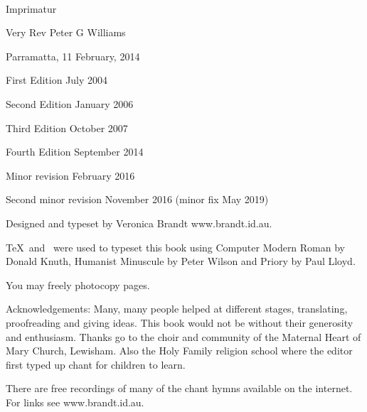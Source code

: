 \ 

\vfill

{\raggedright
{}

\parindent=0mm
\parskip=6pt

Imprimatur
\centerline{Very Rev Peter G Williams}
\rmlyrics

Parramatta, 11 February, 2014

\vfill

First Edition July 2004

Second Edition January 2006

Third Edition October 2007


Fourth Edition September 2014

\qquad Minor revision February 2016

\qquad Second minor revision November 2016 (minor fix May 2019)

Designed and typeset by Veronica Brandt www.brandt.id.au.

\TeX\ and \OpusTeX\ were used to typeset this book using
          Computer Modern Roman by Donald Knuth,
          Humanist Minuscule by Peter Wilson
          and Priory by Paul Lloyd.



You may freely photocopy pages.



Acknowledgements:  Many, many people helped at different stages,
translating, proofreading and giving ideas.  This book would not
be without their generosity and enthusiasm.
Thanks go to the choir and community of the Maternal Heart of Mary
Church, Lewisham.  Also the Holy Family 
religion school where the editor first typed up chant for children
to learn. 

There are free recordings of many of the chant hymns available
on the internet.  For links see www.brandt.id.au.



}

